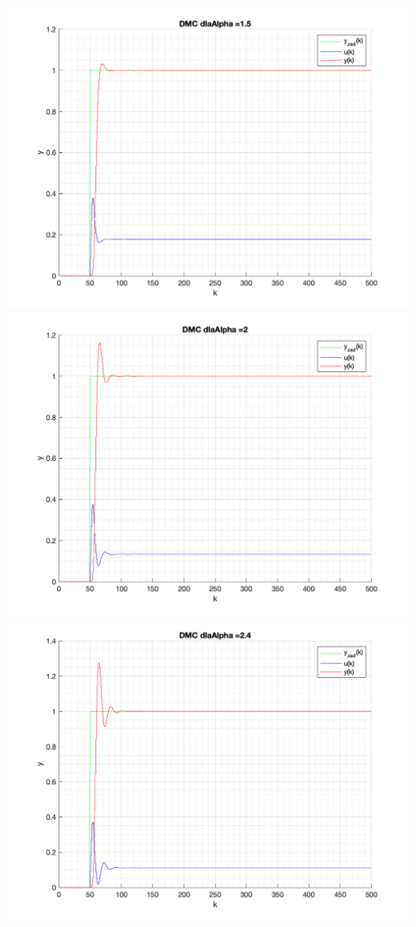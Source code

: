 \documentclass[a4paper, 11pt]{article}
\begin{document}
\begin{enumerate}
 \includegraphics[width=\linewidth]{./ModelsDodatkowe_Alpha/P4_DMC_Alpha_1_5_png.png} 
 \includegraphics[width=\linewidth]{./ModelsDodatkowe_Alpha/P4_DMC_Alpha_2_png.png} 
 \includegraphics[width=\linewidth]{./ModelsDodatkowe_Alpha/P4_DMC_Alpha_2_4_png.png} 
 

\end{enumerate}
\end{document}
